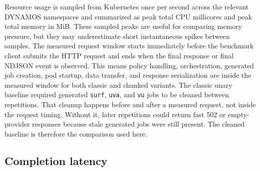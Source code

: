 Resource usage is sampled from Kubernetes once per second across the relevant DYNAMOS namespaces and summarized as peak total CPU millicores and peak total memory in MiB. These sampled peaks are useful for comparing memory pressure, but they may underestimate short instantaneous spikes between samples. The measured request window starts immediately before the benchmark client submits the HTTP request and ends when the final response or final NDJSON event is observed. This means policy handling, orchestration, generated job creation, pod startup, data transfer, and response serialization are inside the measured window for both classic and chunked variants. The classic unary baseline required generated \texttt{surf}, \texttt{uva}, and \texttt{vu} jobs to be cleaned between repetitions. That cleanup happens before and after a measured request, not inside the request timing. Without it, later repetitions could return fast 502 or empty-provider responses because stale generated jobs were still present. The cleaned baseline is therefore the comparison used here.

\subsection{Completion latency}

\begin{table}[!t]
    \centering
    \scriptsize
    \caption{Average completion latency for DYNAMOS bulk retrieval. All cells completed 20/20 valid repetitions.}
    \label{tab:dynamos-rq3-latency}
    \setlength{\tabcolsep}{3pt}
\end{table}

